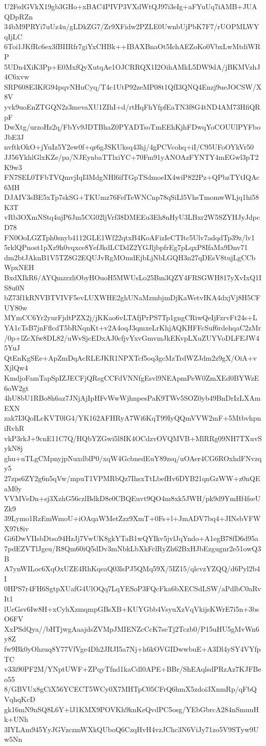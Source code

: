 U2FsdGVkX19gb3GHo+xBAC4PIVP3VXdWtQJ97i3eIg+aFYuUq7iAMB+JUAQDpRZn
34bM9PRYi7uUz4u/gLDkZG7/Zr9XFidw2PZLE0UwnbUjPbK7F7/rUOPMLWYqIjLC
6Toi1JKfRc6ex3fBIIRfr7giYxCHBk++IBAXBnaOt5IchAEZoKo0VbxLwMtdiWRP
5UDn4XiK3Pp+E0MxfQyXutqAe1OJCRRQX1I2OihAMkL5DW9dA/jBKMVzhJ4C6xvw
SRP608E3KfG94pqvNHuCyq/T4c1UtP92zeMP08t1QfI3QNQ4Enzj9ueJOCSW/X8V
yvk9uoEnZTGQN2z3mevaXU1ZIhI+d/rtHqFhYfpfEaTN3f8G4tND4AM73HfiQRpF
DwXtg/urzoHz2q/FbYv9JDTBhaZ0PYADTsoTmEEhKjhFDwqYoCOUUlPYFboJbE3J
nvftkOkO+jYuIz5Y2ew0f+qr6gJSKUksq43hj/4gPCVcohq+iI/C95UFoOYkVr50
JJ56YkhlGlxKZe/pa/NJEynbaTTlxiYC+70Fm91yANOAzFYNTY4mEGwl3pT2K9w3
FN7SEL0TFbTVQmvjIqI3MdgNHl6ifTGpTSdmoeIX4wiP822Pz+QPbzTYtIQAc6MH
DJAIV3sBE5xTp7skSG+TKUmz76FefTeWNCnp78qSiLl5VhsTmomwWLjq1hi58K3T
vRb3OXmNStq4ujP6Jm5CG02ljVrf38DMEEu3Eh8nHyU3LBxr2W5SZYHJyJdpcD78
FN0OoLGZTph0snyb4112GLE1Wf22qtxB4KoAFizIeCTItc5Ulv7adqdTp39z/lv1
5rklQPnost1pXz9h0vqxce8YefJkdLCDdZ2YGJljbpfrEg7pLqxP8IfaMa9Dnv71
dm2btJAknB1V5TZ8G2EQUJvRgMOmdEjbLjNbLGQH3n27qDEsV8tujLgCCbWpxNEH
BxdXIkR6/AYQmzrzliObyHOuoH5MWUsLo25Bm3QZY4FRSGWH817yXvIxQ1IS8u0N
bZ73f1kRNVBTVIVF5evLUXWHE2ghUNaMzmbjmDjKaWetvIKA4dxjVj8H5CFUY80w
MYmCC6Yr2yurFjdtPZX2j/jKKao6vLTAfjPrPS7Tp1gngCRiwQeIjFzrvFt24s+L
YA1cTsB7jnFflcdT5bRNqnKt+v2A4oqJ3qmxeLrKhjAQKHFFcSuf6rdehqaC2zMr
/0p+lZcXfw8DL82/uWvSjcEDxAJ0cfjvYxvGmvmJkEKvpLXuZUYVoDLFEJW45YuJ
QtEnKgSEe+ApZmDqAcRLEJKR1NPXTcf5oq3gcMzTrdWZJdm2z9gX/OiA+vXjlQw4
KmdjoFamTapSpIZJECFjQRsgCCFdVNNfgEsvl9NEApmPeW0ZmXEd0BYWzE6oW2gt
4hU8bU1RBo8h6az7JNjAjIpHFvWwWjhnpesPaK9TWv5SOZ0yb49BnDrIzLXAmEXN
zak7I3QoILcKVT0lG4/YK162AFHRyA7Wi6KqT99IyQQmVVW2mF+5MtbvhpniRvhR
vkP3rkJ+9cnE11C7Q/HQbYZGwi5l8IK4OCdzvOVQMVB+MlRRg09NH7TXuvSykN8j
ghu+uTLgCMpnyjpNuxdblP0/xqW4GcbnedEuY89zsq/uOAer4CG6ROxhdFNvzqy5
27zps6ZY2g6n5qVw/mpuT1VPMRbQz7IhsxTtLbefHv6DYB21qnGzWW+z0nQEaM0y
VVMVeDn+sj3XzhG56czlBdkD8e0CBQEuvt9QO4m8xk5JWH/pk9d9YmHf4fseUZk9
39Lymo1RzEmWmoU+iOAqaWMetZzz9XmT+0Fs+l+JmADV7bq4+JINsbVFWX97t8iv
Gi6DwVIIsbDtso94HzJj7VwUK8gkYTaB1wQYIkv5jvlJqYndo+A1egB78fD6d95a
7pdEZVTlJgeu/R8Qm60iQ5dDv3mNbkLbXkFclRyZh62BxHJbEzgugnr2e51owQ3B
A7ynWILoc6XqOxUZE4RhKqeaQ03lsPJ5QMq59X/5IZ15/qlcvzYZQQ/d6Pyl2b4I
0HPS7r4FH6SgtpXUafG4UlOQq7LqYESoP3FQcFka6bXECSdLSW/aPdlbC0aRvIt1
lUcGsv6Iw8H+xCyhXzmqmpGBsXB+KUYGbb4VsyuXzVqVkijsKWrE7i5n+3bsO6FV
XxPSdQya//bHTjwgAaajdsZVMpJMIENZcCcK7seTj2Tczb0/P15uHU5gMvWn6y8Z
fw9Bk0yOhzuq8Y77VfVge4Dh2JRJI5a7Nj+h6kOVGIDwwbuE+A3Dl4ySY4VYfpTC
v33i90PF2M/YNptUWF+ZPqyTfnd1kaCdl0APE+BBr/ShEAqlsdPRzAz7KJFBeo55
8/GBVUx8gCiX56YCECT5WCy0X7MHTpC05CFrQ6hmX5zdoi3XnmRp/qFbQVqhqKcD
gk16mN9nSQ8L6Y+lJ1KMX9POVKh9knKeQvdPC5osg/YEbGbrcA284nSmuuHk+UNh
3IYLAm945YyJGVzczmWXkQUboQ6CzqHvH4vzJChc3N6ViJy71zo5V9STyw9Uw5Nn
